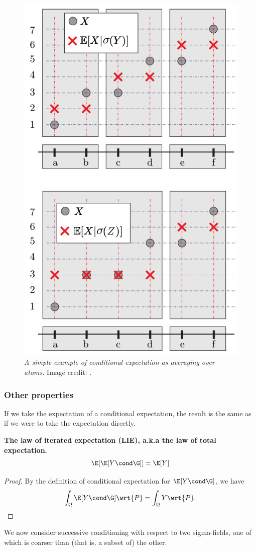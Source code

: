 \documentclass{article} %
\begin{document}
\begin{example}
\begin{figure}[H]
\centering
\includegraphics[width=.4\linewidth]{images/zitokovic_example_conditional_expectation_as_average_over_atoms}
\caption{ \textit{A simple example of conditional expectation as averaging over atoms.} Image credit: \cite{zitkovic2013lecture10}.}
\label{fig:zitkovic_example_conditional_expectation_as_averaging_over_atoms}	
\end{figure}

\end{example}




\subsubsection{Other properties}

If we take the expectation of a conditional expectation, the result is the same as if we were to take the expectation directly. 

\begin{theorem} \textbf{The law of iterated expectation (LIE), a.k.a the law of total expectation.} 
\[ \E[\E[Y \cond \G]] = \E[Y]\]
\end{theorem}

\begin{proof}
By the definition of conditional expectation for $\E[Y \cond \G]$, we have
\[ \int_\Omega \E[Y \cond \G] \wrt{P} = \int_\Omega Y \wrt{P}.  \]	
\end{proof}


We now consider successive conditioning with respect to two sigma-fields, one of which is coarser than (that is, a subset of) the other.
\end{document}
